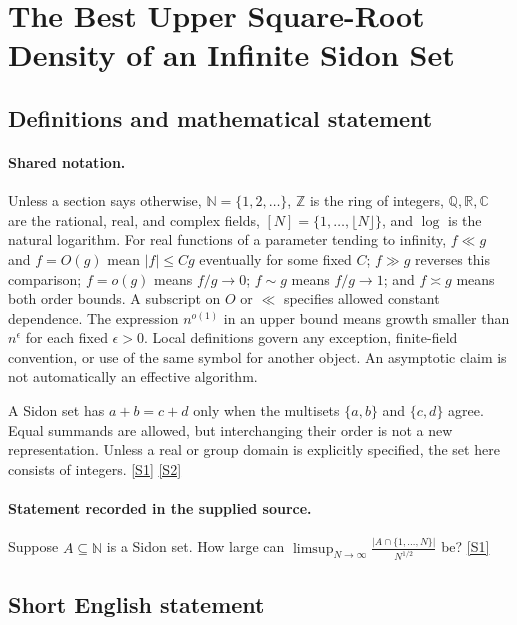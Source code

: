 \documentclass[11pt,a4paper]{article}
\newcommand{\N}{\mathbb{N}}
\newcommand{\Z}{\mathbb{Z}}
\newcommand{\Q}{\mathbb{Q}}
\newcommand{\R}{\mathbb{R}}
\newcommand{\C}{\mathbb{C}}
\newcommand{\sref}[2]{\hyperlink{source:#1:#2}{[S#2]}}
\begin{document}
\section{The Best Upper Square-Root Density of an Infinite Sidon Set}\label{statement}


\subsection{Definitions and mathematical statement}

\paragraph{Shared notation.}Unless a section says otherwise, $\N=\{1,2,\ldots\}$,
$\Z$ is the ring of integers, $\Q,\R,\C$ are the rational, real, and complex
fields, $[N]=\{1,\ldots,\lfloor N\rfloor\}$, and $\log$ is the natural
logarithm. For real functions of a parameter tending to infinity,
$f\ll g$ and $f=O(g)$ mean $|f|\leq Cg$ eventually for some fixed $C$;
$f\gg g$ reverses this comparison; $f=o(g)$ means $f/g\to0$;
$f\sim g$ means $f/g\to1$; and $f\asymp g$ means both order bounds.
A subscript on $O$ or $\ll$ specifies allowed constant dependence.
The expression $n^{o(1)}$ in an upper bound means growth smaller than
$n^\epsilon$ for each fixed $\epsilon>0$. Local definitions govern any
exception, finite-field convention, or use of the same symbol for another
object. An asymptotic claim is not automatically an effective algorithm.



A Sidon set has $a+b=c+d$ only when the multisets $\{a,b\}$ and $\{c,d\}$ agree. Equal summands are allowed, but interchanging their order is not a new representation. Unless a real or group domain is explicitly specified, the set here consists of integers. \sref{statement}{1} \sref{statement}{2}

\paragraph{Statement recorded in the supplied source.}
Suppose $A\subseteq \mathbb{N}$ is a Sidon set. How large can $ \limsup_{N\to \infty}\frac{\lvert A\cap \{1,\ldots,N\}\rvert}{N^{1/2}} $ be? \sref{statement}{1}

\subsection{Short English statement}
\end{document}
